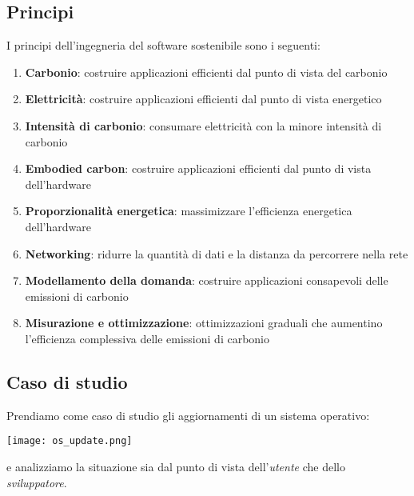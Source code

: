 \subsection{Principi}
I principi dell'ingegneria del software sostenibile sono i seguenti:
\begin{enumerate}
	\item \textbf{Carbonio}: costruire applicazioni efficienti dal punto di vista del carbonio
	\item \textbf{Elettricità}: costruire applicazioni efficienti dal punto di vista energetico
	\item \textbf{Intensità di carbonio}: consumare elettricità con la minore intensità di carbonio
	\item \textbf{Embodied carbon}: costruire applicazioni efficienti dal punto di vista dell'hardware
	\item \textbf{Proporzionalità energetica}: massimizzare l'efficienza energetica dell'hardware
	\item \textbf{Networking}: ridurre la quantità di dati e la distanza da percorrere nella rete
	\item \textbf{Modellamento della domanda}: costruire applicazioni consapevoli delle emissioni di carbonio
	\item \textbf{Misurazione e ottimizzazione}: ottimizzazioni graduali che aumentino l'efficienza complessiva delle emissioni di carbonio
\end{enumerate}

\subsection{Caso di studio}
Prendiamo come caso di studio gli aggiornamenti di un sistema operativo:
\begin{center}
	\texttt{[image: os\_update.png]}
\end{center}
e analizziamo la situazione sia dal punto di vista dell'\emph{utente} che dello \emph{sviluppatore}.
